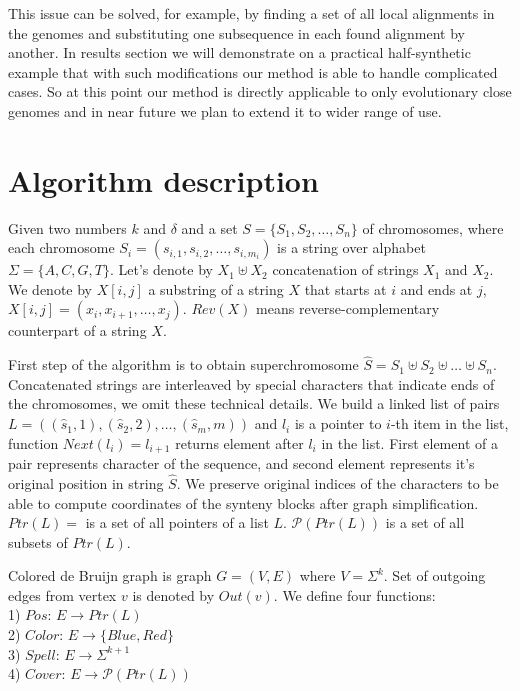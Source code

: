 \documentclass[a4paper, 12pt]{scrartcl}
\begin{document}
This issue can be solved, for example, by finding a set of all local alignments in the genomes and substituting one subsequence in each found alignment
by another. In results section we will demonstrate on a practical half-synthetic example that with such modifications our method is able to handle
complicated cases. So at this point our method is directly applicable to only evolutionary close genomes and  in near future we plan to extend it to
wider range of use.

\section{Algorithm description}

Given two numbers \(k\) and \(\delta\) and a set \(S = \lbrace S_{1}, S_{2}, \ldots, S_{n} \rbrace \) of chromosomes,
where each chromosome  \(S_{i} = (s_{i, 1}, s_{i, 2}, \ldots, s_{i, m_i})\) is a string over alphabet \(\Sigma = \lbrace A, C, G, T \rbrace\).
Let's denote by \(X_{1} \uplus X_{2}\) concatenation of strings \(X_{1}\) and \(X_{2}\). We denote by \(X[i, j]\) a substring of a string \(X\) that
starts at \(i\) and ends at \(j\), \(X[i, j] = (x_{i}, x_{i + 1}, \ldots, x_{j}) \). \(Rev(X)\) means reverse-complementary counterpart of a string \(X\).

First step of the algorithm is to obtain superchromosome \(\hat{S} = S_{1} \uplus S_{2} \uplus \ldots \uplus S_{n} \). Concatenated
strings are interleaved by special characters that indicate ends of the chromosomes, we omit these technical details. We build a linked list of
pairs \(L = ((\hat{s}_1, 1), (\hat{s}_2, 2), \ldots, (\hat{s}_{m}, m))\) and \(l_i\) is a pointer to \(i\)-th item in the list, function \(Next(l_i) = l_{i + 1}\) returns
element after \(l_i\) in the list.
First element of a pair represents character of the sequence, and second element represents it's original position in string \(\hat{S}\). We preserve
original indices of the characters to be able to compute coordinates of the synteny blocks after graph simplification.
\(Ptr(L) = \) is a set of all pointers of a list \(L\). \( \mathcal P \left({Ptr(L)}\right) \) is a set of all subsets of \(Ptr(L)\).

Colored de Bruijn graph is graph \(G = (V, E) \) where \(V = \Sigma ^ k \). Set of outgoing edges from vertex \(v\) is denoted by \(Out(v)\). We define four functions: \\
1) \(Pos : \, E \rightarrow Ptr(L) \) \\
2) \(Color : \, E \rightarrow \lbrace Blue, Red \rbrace \) \\
3) \(Spell: \, E \rightarrow \Sigma ^ {k + 1} \) \\
4) \(Cover: \, E \rightarrow  \mathcal P \left({Ptr(L)}\right) \)
\end{document}
